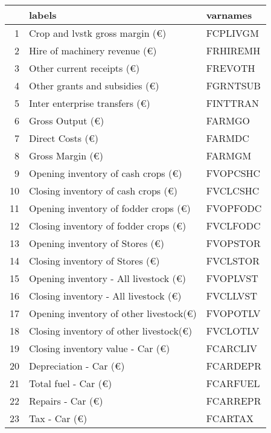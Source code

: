 \documentclass{article}\usepackage{graphicx, color}
\begin{document}
\begin{flushleft}
\newpage
\begin{table}[ht]
\begin{center}
\begin{tabular}{rll}
  \hline
 & labels & varnames \\ 
  \hline
1 & Crop and lvstk   gross margin  (€) & FCPLIVGM \\ 
  2 & Hire of machinery revenue      (€) & FRHIREMH \\ 
  3 & Other current receipts         (€) & FREVOTH \\ 
  4 & Other grants and subsidies     (€) & FGRNTSUB \\ 
  5 & Inter enterprise transfers     (€) & FINTTRAN \\ 
  6 & Gross Output                   (€) & FARMGO \\ 
  7 & Direct Costs                   (€) & FARMDC \\ 
  8 & Gross Margin                   (€) & FARMGM \\ 
  9 & Opening inventory of cash crops    (€) & FVOPCSHC \\ 
  10 & Closing inventory of cash crops    (€) & FVCLCSHC \\ 
  11 & Opening inventory of fodder crops  (€) & FVOPFODC \\ 
  12 & Closing inventory of fodder crops  (€) & FVCLFODC \\ 
  13 & Opening inventory of Stores        (€) & FVOPSTOR \\ 
  14 & Closing inventory of Stores        (€) & FVCLSTOR \\ 
  15 & Opening inventory - All livestock  (€) & FVOPLVST \\ 
  16 & Closing inventory - All livestock  (€) & FVCLLVST \\ 
  17 & Opening inventory of other livestock(€) & FVOPOTLV \\ 
  18 & Closing inventory of other livestock(€) & FVCLOTLV \\ 
  19 & Closing inventory value - Car   (€) & FCARCLIV \\ 
  20 & Depreciation - Car              (€) & FCARDEPR \\ 
  21 & Total fuel - Car                (€) & FCARFUEL \\ 
  22 & Repairs - Car                   (€) & FCARREPR \\ 
  23 & Tax - Car                       (€) & FCARTAX \\ 

\end{tabular}
\end{center}
\end{table}
\end{flushleft}
\end{document}
